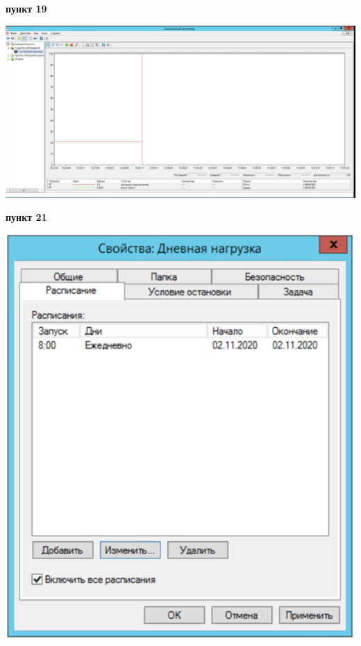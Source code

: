 \documentclass[a4paper,14pt]{extarticle}
\begin{document}
    \newpage
    \textbf{пункт 19}
    \begin{center}
        \includegraphics[scale=0.4]{19.png}
    \end{center}

    \textbf{пункт 21}
    \begin{center}
        \includegraphics[scale=0.7]{21.1.png}
    \end{center}
\end{document}
